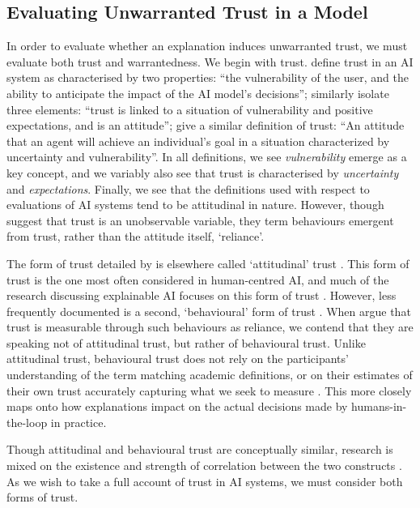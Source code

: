 \subsection{Evaluating Unwarranted Trust in a Model}
In order to evaluate whether an explanation induces unwarranted trust, we must evaluate both trust and warrantedness. We begin with trust. \textcite{jacovi_formalizing_2021} define trust in an AI system as characterised by two properties: ``the vulnerability of the user, and the ability to anticipate the impact of the AI model's decisions''; \textcite{vereschak_how_2021} similarly isolate three elements: ``trust is linked to a situation of vulnerability and positive expectations, and is an attitude''; \textcite{lee_trust_2004} give a similar definition of trust: ``An attitude that an agent will achieve an individual's goal in a situation characterized by uncertainty and vulnerability''. In all definitions, we see \emph{vulnerability} emerge as a key concept, and we variably also see that trust is characterised by \emph{uncertainty} and \emph{expectations}. Finally, we see that the definitions used with respect to evaluations of AI systems tend to be attitudinal in nature. However, though \textcite{vereschak_how_2021} suggest that trust is an unobservable variable, they term behaviours emergent from trust, rather than the attitude itself, `reliance'. 

The form of trust detailed by \textcite{vereschak_how_2021} is elsewhere called `attitudinal' trust \cite{crites_measuring_1994}. This form of trust is the one most often considered in human-centred AI, and much of the research discussing explainable AI focuses on this form of trust \cite{vereschak_how_2021, ford_play_2020, bansal_does_2021, yin_understanding_2019}. However, less frequently documented is a second, `behavioural' form of trust \cite{crites_measuring_1994}. When \textcite{jacovi_formalizing_2021,lee_trust_2004} argue that trust is measurable through such behaviours as reliance, we contend that they are speaking not of attitudinal trust, but rather of behavioural trust. Unlike attitudinal trust, behavioural trust does not rely on the participants' understanding of the term matching academic definitions, or on their estimates of their own trust accurately capturing what we seek to measure \cite{jacovi_formalizing_2021}. This more closely maps onto how explanations impact on the actual decisions made by humans-in-the-loop in practice.

Though attitudinal and behavioural trust are conceptually similar, research is mixed on the existence and strength of correlation between the two constructs \cite{ahmed_relationship_2009, kim_relation_2018}. As we wish to take a full account of trust in AI systems, we must consider both forms of trust.

